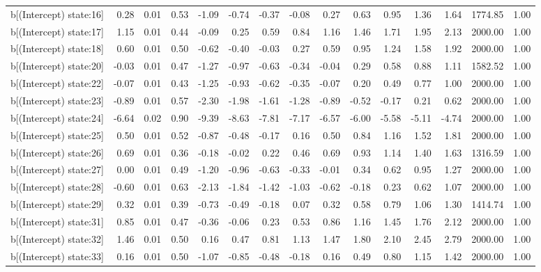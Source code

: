 \begin{table}[ht]
\begin{tabular}{rrrrrrrrrrrrrrr}
  b[(Intercept) state:16] & 0.28 & 0.01 & 0.53 & -1.09 & -0.74 & -0.37 & -0.08 & 0.27 & 0.63 & 0.95 & 1.36 & 1.64 & 1774.85 & 1.00 \\ 
  b[(Intercept) state:17] & 1.15 & 0.01 & 0.44 & -0.09 & 0.25 & 0.59 & 0.84 & 1.16 & 1.46 & 1.71 & 1.95 & 2.13 & 2000.00 & 1.00 \\ 
  b[(Intercept) state:18] & 0.60 & 0.01 & 0.50 & -0.62 & -0.40 & -0.03 & 0.27 & 0.59 & 0.95 & 1.24 & 1.58 & 1.92 & 2000.00 & 1.00 \\ 
  b[(Intercept) state:20] & -0.03 & 0.01 & 0.47 & -1.27 & -0.97 & -0.63 & -0.34 & -0.04 & 0.29 & 0.58 & 0.88 & 1.11 & 1582.52 & 1.00 \\ 
  b[(Intercept) state:22] & -0.07 & 0.01 & 0.43 & -1.25 & -0.93 & -0.62 & -0.35 & -0.07 & 0.20 & 0.49 & 0.77 & 1.00 & 2000.00 & 1.00 \\ 
  b[(Intercept) state:23] & -0.89 & 0.01 & 0.57 & -2.30 & -1.98 & -1.61 & -1.28 & -0.89 & -0.52 & -0.17 & 0.21 & 0.62 & 2000.00 & 1.00 \\ 
  b[(Intercept) state:24] & -6.64 & 0.02 & 0.90 & -9.39 & -8.63 & -7.81 & -7.17 & -6.57 & -6.00 & -5.58 & -5.11 & -4.74 & 2000.00 & 1.00 \\ 
  b[(Intercept) state:25] & 0.50 & 0.01 & 0.52 & -0.87 & -0.48 & -0.17 & 0.16 & 0.50 & 0.84 & 1.16 & 1.52 & 1.81 & 2000.00 & 1.00 \\ 
  b[(Intercept) state:26] & 0.69 & 0.01 & 0.36 & -0.18 & -0.02 & 0.22 & 0.46 & 0.69 & 0.93 & 1.14 & 1.40 & 1.63 & 1316.59 & 1.00 \\ 
  b[(Intercept) state:27] & 0.00 & 0.01 & 0.49 & -1.20 & -0.96 & -0.63 & -0.33 & -0.01 & 0.34 & 0.62 & 0.95 & 1.27 & 2000.00 & 1.00 \\ 
  b[(Intercept) state:28] & -0.60 & 0.01 & 0.63 & -2.13 & -1.84 & -1.42 & -1.03 & -0.62 & -0.18 & 0.23 & 0.62 & 1.07 & 2000.00 & 1.00 \\ 
  b[(Intercept) state:29] & 0.32 & 0.01 & 0.39 & -0.73 & -0.49 & -0.18 & 0.07 & 0.32 & 0.58 & 0.79 & 1.06 & 1.30 & 1414.74 & 1.00 \\ 
  b[(Intercept) state:31] & 0.85 & 0.01 & 0.47 & -0.36 & -0.06 & 0.23 & 0.53 & 0.86 & 1.16 & 1.45 & 1.76 & 2.12 & 2000.00 & 1.00 \\ 
  b[(Intercept) state:32] & 1.46 & 0.01 & 0.50 & 0.16 & 0.47 & 0.81 & 1.13 & 1.47 & 1.80 & 2.10 & 2.45 & 2.79 & 2000.00 & 1.00 \\ 
  b[(Intercept) state:33] & 0.16 & 0.01 & 0.50 & -1.07 & -0.85 & -0.48 & -0.18 & 0.16 & 0.49 & 0.80 & 1.15 & 1.42 & 2000.00 & 1.00 \\ 

\end{tabular}
\end{table}
